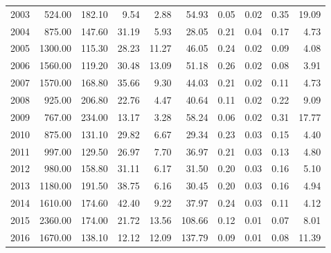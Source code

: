 \begin{table}[ht]
\begin{tabular}{rrrrrrrrrr}
  2003 & 524.00 & 182.10 & 9.54 & 2.88 & 54.93 & 0.05 & 0.02 & 0.35 & 19.09 \\ 
  2004 & 875.00 & 147.60 & 31.19 & 5.93 & 28.05 & 0.21 & 0.04 & 0.17 & 4.73 \\ 
  2005 & 1300.00 & 115.30 & 28.23 & 11.27 & 46.05 & 0.24 & 0.02 & 0.09 & 4.08 \\ 
  2006 & 1560.00 & 119.20 & 30.48 & 13.09 & 51.18 & 0.26 & 0.02 & 0.08 & 3.91 \\ 
  2007 & 1570.00 & 168.80 & 35.66 & 9.30 & 44.03 & 0.21 & 0.02 & 0.11 & 4.73 \\ 
  2008 & 925.00 & 206.80 & 22.76 & 4.47 & 40.64 & 0.11 & 0.02 & 0.22 & 9.09 \\ 
  2009 & 767.00 & 234.00 & 13.17 & 3.28 & 58.24 & 0.06 & 0.02 & 0.31 & 17.77 \\ 
  2010 & 875.00 & 131.10 & 29.82 & 6.67 & 29.34 & 0.23 & 0.03 & 0.15 & 4.40 \\ 
  2011 & 997.00 & 129.50 & 26.97 & 7.70 & 36.97 & 0.21 & 0.03 & 0.13 & 4.80 \\ 
  2012 & 980.00 & 158.80 & 31.11 & 6.17 & 31.50 & 0.20 & 0.03 & 0.16 & 5.10 \\ 
  2013 & 1180.00 & 191.50 & 38.75 & 6.16 & 30.45 & 0.20 & 0.03 & 0.16 & 4.94 \\ 
  2014 & 1610.00 & 174.60 & 42.40 & 9.22 & 37.97 & 0.24 & 0.03 & 0.11 & 4.12 \\ 
  2015 & 2360.00 & 174.00 & 21.72 & 13.56 & 108.66 & 0.12 & 0.01 & 0.07 & 8.01 \\ 
  2016 & 1670.00 & 138.10 & 12.12 & 12.09 & 137.79 & 0.09 & 0.01 & 0.08 & 11.39 \\ 
   \hline
\end{tabular}
\end{table}
